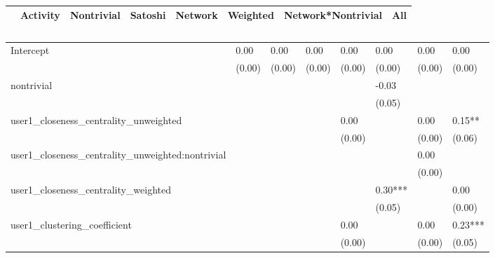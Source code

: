 \begin{table}
\caption{}
\begin{center}
\begin{tabular}{lccccccc}
\hline
                                                 & Activity & Nontrivial & Satoshi & Network &   Weighted   & Network*Nontrivial &   All    \\
\hline
\hline
\end{tabular}
\begin{tabular}{llllllll}
Intercept                                        & 0.00     & 0.00       & 0.00    & 0.00    & 0.00         & 0.00               & 0.00     \\
                                                 & (0.00)   & (0.00)     & (0.00)  & (0.00)  & (0.00)       & (0.00)             & (0.00)   \\
nontrivial                                       &          &            &         &         & -0.03        &                    &          \\
                                                 &          &            &         &         & (0.05)       &                    &          \\
user1_closeness_centrality_unweighted            &          &            &         & 0.00    &              & 0.00               & 0.15**   \\
                                                 &          &            &         & (0.00)  &              & (0.00)             & (0.06)   \\
user1_closeness_centrality_unweighted:nontrivial &          &            &         &         &              & 0.00               &          \\
                                                 &          &            &         &         &              & (0.00)             &          \\
user1_closeness_centrality_weighted              &          &            &         &         & 0.30***      &                    & 0.00     \\
                                                 &          &            &         &         & (0.05)       &                    & (0.00)   \\
user1_clustering_coefficient                     &          &            &         & 0.00    &              & 0.00               & 0.23***  \\
                                                 &          &            &         & (0.00)  &              & (0.00)             & (0.05)   \\

\end{tabular}
\end{center}
\end{table}
